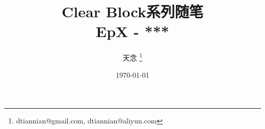 \documentclass{beamer}
\title{Clear Block系列随笔 \\ EpX - ***}
\author{天念 \thanks{dtiannian@gmail.com, dtiannian@aliyun.com}}
\date{\today}
\begin{document}
\begin{frame}
    \titlepage
\end{frame}


\end{document}
